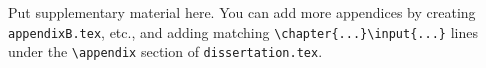 Put supplementary material here. You can add more appendices by creating
\texttt{appendixB.tex}, etc., and adding matching
\texttt{\textbackslash chapter\{...\}\textbackslash input\{...\}} lines under
the \texttt{\textbackslash appendix} section of \texttt{dissertation.tex}.
